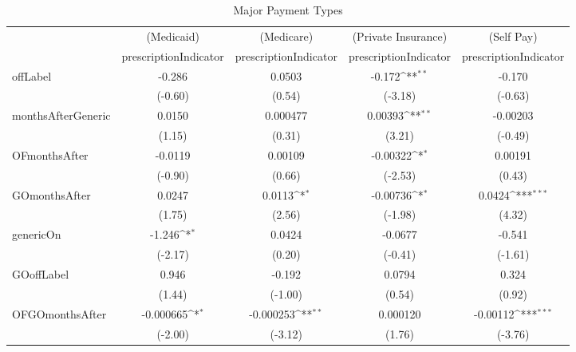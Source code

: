 \begin{table}[htbp]\centering
\def\sym#1{\ifmmode^{#1}\else\(^{#1}\)\fi}
\caption{Major Payment Types\label{tab1}}
\begin{tabular}{l*{4}{c}}
\hline\hline
            &\multicolumn{1}{c}{(Medicaid)}&\multicolumn{1}{c}{(Medicare)}&\multicolumn{1}{c}{(Private Insurance)}&\multicolumn{1}{c}{(Self Pay)}\\
            &\multicolumn{1}{c}{prescriptionIndicator}&\multicolumn{1}{c}{prescriptionIndicator}&\multicolumn{1}{c}{prescriptionIndicator}&\multicolumn{1}{c}{prescriptionIndicator}\\
\hline
offLabel    &      -0.286         &      0.0503         &      -0.172\sym{**} &      -0.170         \\
            &     (-0.60)         &      (0.54)         &     (-3.18)         &     (-0.63)         \\
[1em]
monthsAfterGeneric&      0.0150         &    0.000477         &     0.00393\sym{**} &    -0.00203         \\
            &      (1.15)         &      (0.31)         &      (3.21)         &     (-0.49)         \\
[1em]
OFmonthsAfter&     -0.0119         &     0.00109         &    -0.00322\sym{*}  &     0.00191         \\
            &     (-0.90)         &      (0.66)         &     (-2.53)         &      (0.43)         \\
[1em]
GOmonthsAfter&      0.0247         &      0.0113\sym{*}  &    -0.00736\sym{*}  &      0.0424\sym{***}\\
            &      (1.75)         &      (2.56)         &     (-1.98)         &      (4.32)         \\
[1em]
genericOn   &      -1.246\sym{*}  &      0.0424         &     -0.0677         &      -0.541         \\
            &     (-2.17)         &      (0.20)         &     (-0.41)         &     (-1.61)         \\
[1em]
GOoffLabel  &       0.946         &      -0.192         &      0.0794         &       0.324         \\
            &      (1.44)         &     (-1.00)         &      (0.54)         &      (0.92)         \\
[1em]
OFGOmonthsAfter&   -0.000665\sym{*}  &   -0.000253\sym{**} &    0.000120         &    -0.00112\sym{***}\\
            &     (-2.00)         &     (-3.12)         &      (1.76)         &     (-3.76)         \\

\end{tabular}
\end{table}

